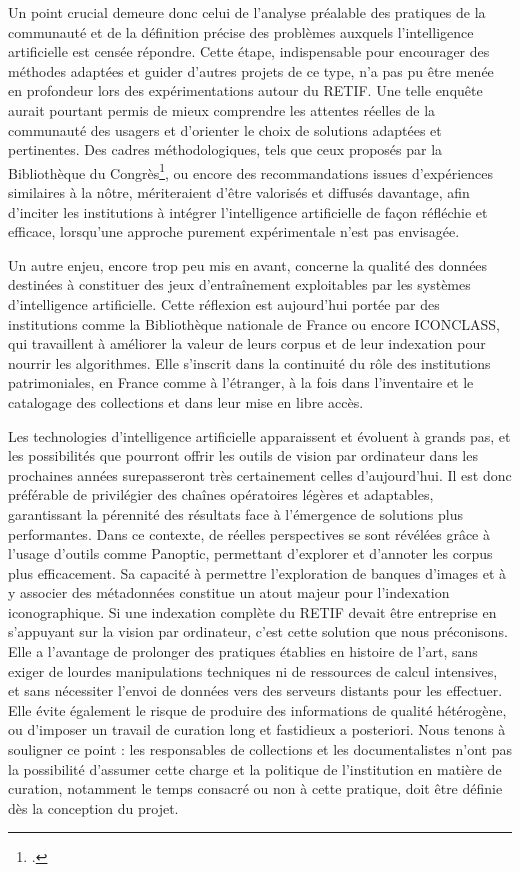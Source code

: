 Un point crucial demeure donc celui de l’analyse préalable des pratiques de la communauté et de la définition précise des problèmes auxquels l’intelligence artificielle est censée répondre. Cette étape, indispensable pour encourager des méthodes adaptées et guider d’autres projets de ce type, n’a pas pu être menée en profondeur lors des expérimentations autour du RETIF. Une telle enquête aurait pourtant permis de mieux comprendre les attentes réelles de la communauté des usagers et d’orienter le choix de solutions adaptées et pertinentes. Des cadres méthodologiques, tels que ceux proposés par la Bibliothèque du Congrès\footcite{libraryofcongressPlanningFrameworkUsed2025}, ou encore des recommandations issues d’expériences similaires à la nôtre, mériteraient d’être valorisés et diffusés davantage, afin d’inciter les institutions à intégrer l’intelligence artificielle de façon réfléchie et efficace, lorsqu’une approche purement expérimentale n’est pas envisagée.

Un autre enjeu, encore trop peu mis en avant, concerne la qualité des données destinées à constituer des jeux d’entraînement exploitables par les systèmes d’intelligence artificielle. Cette réflexion est aujourd’hui portée par des institutions comme la Bibliothèque nationale de France ou encore ICONCLASS, qui travaillent à améliorer la valeur de leurs corpus et de leur indexation pour nourrir les algorithmes. Elle s’inscrit dans la continuité du rôle des institutions patrimoniales, en France comme à l’étranger, à la fois dans l’inventaire et le catalogage des collections et dans leur mise en libre accès.

Les technologies d’intelligence artificielle apparaissent et évoluent à grands pas, et les possibilités que pourront offrir les outils de vision par ordinateur dans les prochaines années surepasseront très certainement celles d’aujourd’hui. Il est donc préférable de privilégier des chaînes opératoires légères et adaptables, garantissant la pérennité des résultats face à l’émergence de solutions plus performantes. Dans ce contexte, de réelles perspectives se sont révélées grâce à l’usage d’outils comme Panoptic, permettant d’explorer et d’annoter les corpus plus efficacement. Sa capacité à permettre l’exploration de banques d’images et à y associer des métadonnées constitue un atout majeur pour l’indexation iconographique. Si une indexation complète du RETIF devait être entreprise en s’appuyant sur la vision par ordinateur, c’est cette solution que nous préconisons. Elle a l’avantage de prolonger des pratiques établies en histoire de l’art, sans exiger de lourdes manipulations techniques ni de ressources de calcul intensives, et sans nécessiter l’envoi de données vers des serveurs distants pour les effectuer. Elle évite également le risque de produire des informations de qualité hétérogène, ou d’imposer un travail de curation long et fastidieux a posteriori. Nous tenons à souligner ce point : les responsables de collections et les documentalistes n’ont pas la possibilité d’assumer cette charge et la politique de l'institution en matière de curation, notamment le temps consacré ou non à cette pratique, doit être définie dès la conception du projet.

